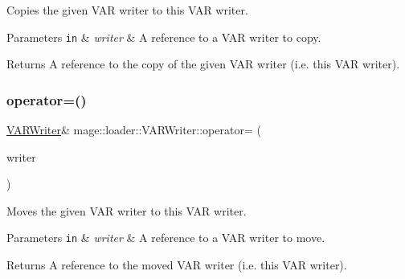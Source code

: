 Copies the given V\+AR writer to this V\+AR writer.


\begin{DoxyParams}[1]{Parameters}
\mbox{\tt in}  & {\em writer} & A reference to a V\+AR writer to copy. \\
\hline
\end{DoxyParams}
\begin{DoxyReturn}{Returns}
A reference to the copy of the given V\+AR writer (i.\+e. this V\+AR writer). 
\end{DoxyReturn}
\hypertarget{classmage_1_1loader_1_1_v_a_r_writer_aef0efc3b6d9ca8c0da5e45063da01365}{}\label{classmage_1_1loader_1_1_v_a_r_writer_aef0efc3b6d9ca8c0da5e45063da01365} 
\subsubsection{\texorpdfstring{operator=()}{operator=()}\hspace{0.1cm}{\footnotesize\ttfamily [2/2]}}
{\footnotesize\ttfamily \hyperlink{classmage_1_1loader_1_1_v_a_r_writer}{V\+A\+R\+Writer}\& mage\+::loader\+::\+V\+A\+R\+Writer\+::operator= (\begin{DoxyParamCaption}\item[{\hyperlink{classmage_1_1loader_1_1_v_a_r_writer}{V\+A\+R\+Writer} \&\&}]{writer }\end{DoxyParamCaption})\hspace{0.3cm}{\ttfamily [delete]}}

Moves the given V\+AR writer to this V\+AR writer.


\begin{DoxyParams}[1]{Parameters}
\mbox{\tt in}  & {\em writer} & A reference to a V\+AR writer to move. \\
\hline
\end{DoxyParams}
\begin{DoxyReturn}{Returns}
A reference to the moved V\+AR writer (i.\+e. this V\+AR writer). 
\end{DoxyReturn}
\hypertarget{classmage_1_1loader_1_1_v_a_r_writer_af2bbf94353f1b4b01aa56e8dd9c89d7f}{}\label{classmage_1_1loader_1_1_v_a_r_writer_af2bbf94353f1b4b01aa56e8dd9c89d7f} 
